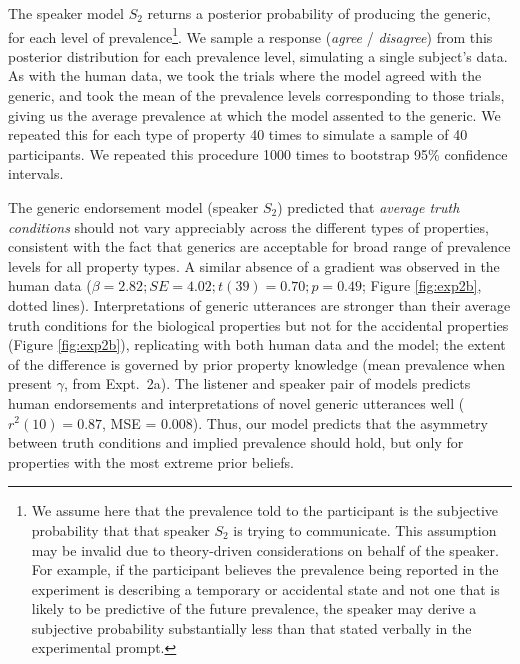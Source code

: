 \documentclass[12pt,letterpaper]{article}
\begin{document}
The speaker model $S_2$ returns a posterior probability of producing the generic, for each level of prevalence\footnote{We assume here that the prevalence told to the participant is the subjective probability that that speaker $S_2$ is trying to communicate. This assumption may be invalid due to theory-driven considerations on behalf of the speaker. For example, if the participant believes the prevalence being reported in the experiment is describing a temporary or accidental state and not one that is likely to be predictive of the future prevalence, the speaker may derive a subjective probability substantially less than that stated verbally in the experimental prompt.}. 
We sample a response (\emph{agree} / \emph{disagree}) from this posterior distribution for each prevalence level, simulating a single subject's data.
As with the human data, we took the trials where the model agreed with the generic, and took the mean of the prevalence levels corresponding to those trials, giving us the average prevalence at which the model assented to the generic.
We repeated this for each type of property 40 times to simulate a sample of 40 participants. 
We repeated this procedure 1000 times to bootstrap 95\% confidence intervals.

The generic endorsement model (speaker $S_2$) predicted that \emph{average truth conditions} should not vary appreciably across the different types of properties, consistent with the fact that generics are acceptable for broad range of prevalence levels for all property types.
A similar absence of a gradient was observed in the human data ($\beta = 2.82; SE = 4.02; t(39) = 0.70; p = 0.49$; Figure \ref{fig:exp2b}, dotted lines). 
Interpretations of generic utterances are stronger than their average truth conditions for the biological properties but not for the accidental properties (Figure \ref{fig:exp2b}), replicating  with both human data and the model; the extent of the difference is governed by prior property knowledge (mean prevalence when present $\gamma$, from Expt.~2a).
The listener and speaker pair of models predicts human endorsements and interpretations of novel generic utterances well ($r^2(10) = 0.87$, MSE = 0.008).
Thus, our model predicts that the asymmetry between truth conditions and implied prevalence should hold, but only for properties with the most extreme prior beliefs.
\end{document}
